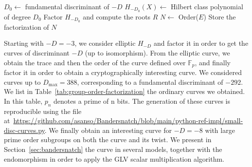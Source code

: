 \documentclass[version=preprint]{iacrcc}
\begin{document}
\begin{algorithm}
\caption{Search of curves}
\label{alg:search}
\begin{algorithmic}[1]
        \State $D_0 \gets$ fundamental discriminant of $-D$
        \State $H_{-D_0}(X) \gets$ Hilbert class polynomial of degree $D_0$
        \State Factor $H_{-D_0}$ and compute the roots $R$
                    \State $N \gets$ Order($E$)
                    \State Store the factorization of $N$
                \EndIf
            \EndFor
        \EndFor 
    \EndFor
\end{algorithmic}
\end{algorithm}

Starting with $-D = -3$, we consider elliptic  $H_{-D}$ and factor it in order to get the curves of discriminant $-D$ (up to isomorphism). From the elliptic curve, we obtain the trace and then the order of the curve defined over $\mathbb F_p$, and finally factor it in order to obtain a cryptographically interesting curve.
We considered curves up to $D_{\max} = 388$, corresponding to a fundamental discriminant of $-292$.
We list in Table~\ref{tab:group-order-factorization} the ordinary curves we obtained. In this table,
$p_n$ denotes a prime of n bits. The generation of these curves is reproducible
using the file at~\url{https://github.com/asanso/Bandersnatch/blob/main/python-ref-impl/small-disc-curves.py}.
We finally obtain an interesting curve for $-D = -8$ with large prime order subgroups on both the curve and its twist. We present in Section~\ref{sec:bandersnatch} the curve in several models, together with the endomorphism in order to apply the GLV scalar multiplication algorithm.
\end{document}

